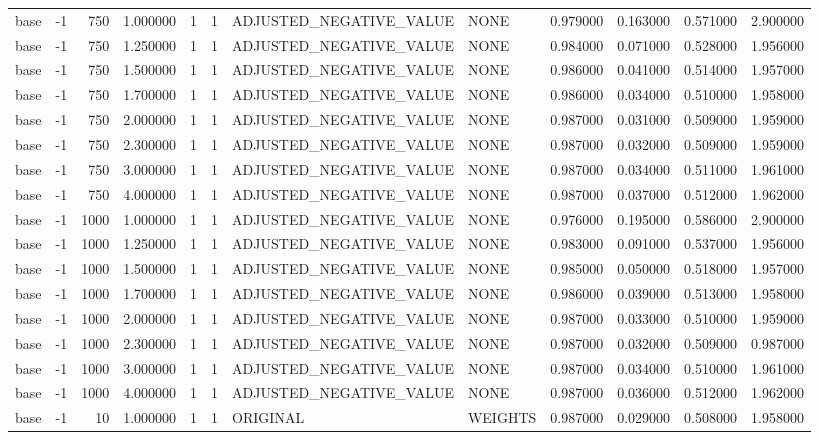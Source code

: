 \begin{tabular}{lrrrllllrrrr}
base & -1 & 750 & 1.000000 & 1 & 1 & ADJUSTED_NEGATIVE_VALUE & NONE & 0.979000 & 0.163000 & 0.571000 & 2.900000 \\
base & -1 & 750 & 1.250000 & 1 & 1 & ADJUSTED_NEGATIVE_VALUE & NONE & 0.984000 & 0.071000 & 0.528000 & 1.956000 \\
base & -1 & 750 & 1.500000 & 1 & 1 & ADJUSTED_NEGATIVE_VALUE & NONE & 0.986000 & 0.041000 & 0.514000 & 1.957000 \\
base & -1 & 750 & 1.700000 & 1 & 1 & ADJUSTED_NEGATIVE_VALUE & NONE & 0.986000 & 0.034000 & 0.510000 & 1.958000 \\
base & -1 & 750 & 2.000000 & 1 & 1 & ADJUSTED_NEGATIVE_VALUE & NONE & 0.987000 & 0.031000 & 0.509000 & 1.959000 \\
base & -1 & 750 & 2.300000 & 1 & 1 & ADJUSTED_NEGATIVE_VALUE & NONE & 0.987000 & 0.032000 & 0.509000 & 1.959000 \\
base & -1 & 750 & 3.000000 & 1 & 1 & ADJUSTED_NEGATIVE_VALUE & NONE & 0.987000 & 0.034000 & 0.511000 & 1.961000 \\
base & -1 & 750 & 4.000000 & 1 & 1 & ADJUSTED_NEGATIVE_VALUE & NONE & 0.987000 & 0.037000 & 0.512000 & 1.962000 \\
base & -1 & 1000 & 1.000000 & 1 & 1 & ADJUSTED_NEGATIVE_VALUE & NONE & 0.976000 & 0.195000 & 0.586000 & 2.900000 \\
base & -1 & 1000 & 1.250000 & 1 & 1 & ADJUSTED_NEGATIVE_VALUE & NONE & 0.983000 & 0.091000 & 0.537000 & 1.956000 \\
base & -1 & 1000 & 1.500000 & 1 & 1 & ADJUSTED_NEGATIVE_VALUE & NONE & 0.985000 & 0.050000 & 0.518000 & 1.957000 \\
base & -1 & 1000 & 1.700000 & 1 & 1 & ADJUSTED_NEGATIVE_VALUE & NONE & 0.986000 & 0.039000 & 0.513000 & 1.958000 \\
base & -1 & 1000 & 2.000000 & 1 & 1 & ADJUSTED_NEGATIVE_VALUE & NONE & 0.987000 & 0.033000 & 0.510000 & 1.959000 \\
base & -1 & 1000 & 2.300000 & 1 & 1 & ADJUSTED_NEGATIVE_VALUE & NONE & 0.987000 & 0.032000 & 0.509000 & 0.987000 \\
base & -1 & 1000 & 3.000000 & 1 & 1 & ADJUSTED_NEGATIVE_VALUE & NONE & 0.987000 & 0.034000 & 0.510000 & 1.961000 \\
base & -1 & 1000 & 4.000000 & 1 & 1 & ADJUSTED_NEGATIVE_VALUE & NONE & 0.987000 & 0.036000 & 0.512000 & 1.962000 \\
base & -1 & 10 & 1.000000 & 1 & 1 & ORIGINAL & WEIGHTS & 0.987000 & 0.029000 & 0.508000 & 1.958000 \\

\end{tabular}
